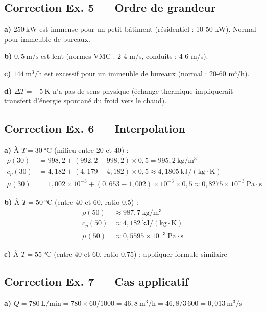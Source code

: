 \subsection*{Correction Ex. 5 — Ordre de grandeur}

\textbf{a)} $250~\mathrm{kW}$ est immense pour un petit bâtiment (résidentiel : 10-50 kW). Normal pour immeuble de
bureaux.

\textbf{b)} $0{,}5~\mathrm{m/s}$ est lent (normes VMC : 2-4 m/s, conduits : 4-6 m/s).

\textbf{c)} $144~\mathrm{m^3/h}$ est excessif pour un immeuble de bureaux (normal : 20-60 m³/h).

\textbf{d)} $\Delta T = -5~\mathrm{K}$ n'a pas de sens physique (échange thermique impliquerait transfert d'énergie
spontané du froid vers le chaud).

\subsection*{Correction Ex. 6 — Interpolation}

\textbf{a)} À $T = 30~\mathrm{°C}$ (milieu entre 20 et 40) :
\begin{align*}
  \rho(30) &= 998{,}2 + (992{,}2 - 998{,}2) \times 0{,}5 = 995{,}2~\mathrm{kg/m^3} \\
  c_p(30) &= 4{,}182 + (4{,}179 - 4{,}182) \times 0{,}5 \approx 4{,}1805~\mathrm{kJ/(kg \cdot K)} \\
  \mu(30) &= 1{,}002 \times 10^{-3} + (0{,}653 - 1{,}002) \times 10^{-3} \times 0{,}5 \approx 0{,}8275 \times 10^{-3}~\mathrm{Pa \cdot s}
\end{align*}

\textbf{b)} À $T = 50~\mathrm{°C}$ (entre 40 et 60, ratio 0,5) :
\begin{align*}
  \rho(50) &\approx 987{,}7~\mathrm{kg/m^3} \\
  c_p(50) &\approx 4{,}182~\mathrm{kJ/(kg \cdot K)} \\
  \mu(50) &\approx 0{,}5595 \times 10^{-3}~\mathrm{Pa \cdot s}
\end{align*}

\textbf{c)} À $T = 55~\mathrm{°C}$ (entre 40 et 60, ratio 0,75) : appliquer formule similaire

\subsection*{Correction Ex. 7 — Cas applicatif}

\textbf{a)} $Q = 780~\mathrm{L/min} = 780 \times 60 / 1000 = 46{,}8~\mathrm{m^3/h} = 46{,}8 / 3\,600 = 0{,}013~
\mathrm{m^3/s}$

